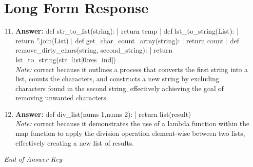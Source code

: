 \documentclass[12pt]{article}
\begin{document}
\section*{Long Form Response}
\begin{enumerate}[label=\arabic*.]
\setcounter{enumi}{10}
\item \textbf{Answer:} def str\_to\_list(string): | return temp | def lst\_to\_string(List): | return ''.join(List) | def get\_char\_count\_array(string): | return count | def remove\_dirty\_chars(string, second\_string): | return lst\_to\_string(str\_list[0:res\_ind])
\\ \textit{Note:} correct because it outlines a process that converts the first string into a list, counts the characters, and constructs a new string by excluding characters found in the second string, effectively achieving the goal of removing unwanted characters.
\item \textbf{Answer:} def div\_list(nums 1,nums 2): | return list(result)
\\ \textit{Note:} correct because it demonstrates the use of a lambda function within the map function to apply the division operation element-wise between two lists, effectively creating a new list of results.
\end{enumerate}

\vfill
\noindent\textit{End of Answer Key}
\end{document}
